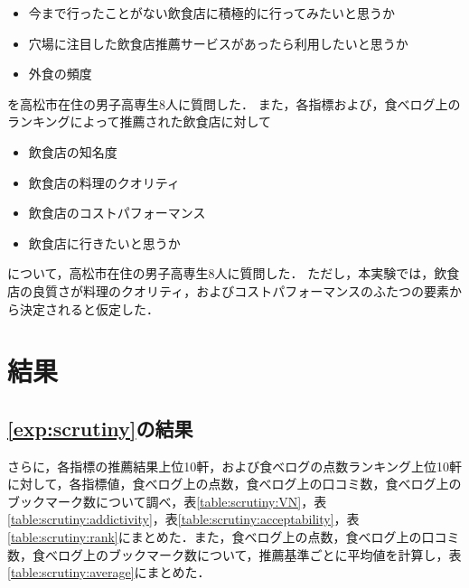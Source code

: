 		\begin{itemize}
			\item 今まで行ったことがない飲食店に積極的に行ってみたいと思うか
			\item 穴場に注目した飲食店推薦サービスがあったら利用したいと思うか
			\item 外食の頻度
		\end{itemize}
		を高松市在住の男子高専生8人に質問した．
		また，各指標および，食べログ上のランキングによって推薦された飲食店に対して
		\begin{itemize}
			\item 飲食店の知名度
			\item 飲食店の料理のクオリティ
			\item 飲食店のコストパフォーマンス
			\item 飲食店に行きたいと思うか
		\end{itemize}
		について，高松市在住の男子高専生8人に質問した．
		ただし，本実験では，飲食店の良質さが料理のクオリティ，およびコストパフォーマンスのふたつの要素から決定されると仮定した．\par
\section{結果}
	\subsection{\ref{exp:scrutiny}の結果}
	さらに，各指標の推薦結果上位10軒，および食べログの点数ランキング上位10軒に対して，各指標値，食べログ上の点数，食べログ上の口コミ数，食べログ上のブックマーク数について調べ，表\ref{table:scrutiny:VN}，表\ref{table:scrutiny:addictivity}，表\ref{table:scrutiny:acceptability}，表\ref{table:scrutiny:rank}にまとめた．また，食べログ上の点数，食べログ上の口コミ数，食べログ上のブックマーク数について，推薦基準ごとに平均値を計算し，表\ref{table:scrutiny:average}にまとめた．
	
	
	
	
	
	\newpage

